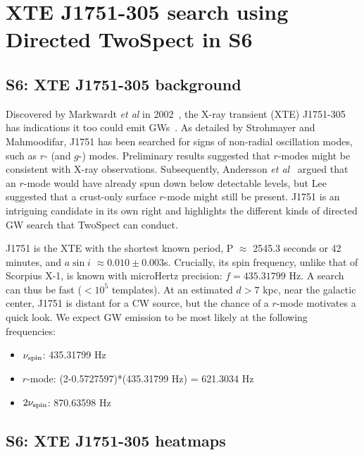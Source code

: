 \section{XTE J1751-305 search using Directed TwoSpect in S6}

\subsection{S6: XTE J1751-305 background}

Discovered by Markwardt \textit{et al} in 2002~\cite{Markwardt2002}, the X-ray transient (XTE) J1751-305 has indications it too could emit GWs~\cite{Strohmayer2014}.
As detailed by Strohmayer and Mahmoodifar, J1751 has been searched for signs of non-radial oscillation modes, such as $r$- (and $g$-) modes.
Preliminary results suggested that $r$-modes might be consistent with X-ray observations.
Subsequently, Andersson \textit{et al}~\cite{Andersson2014} argued that an $r$-mode would have already spun down below detectable levels, but Lee~\cite{Lee2014} suggested that a crust-only surface $r$-mode might still be present. 
 J1751 is an intriguing candidate in its own right and highlights the different kinds of directed GW search that TwoSpect can conduct.

J1751 is the XTE with the shortest known period,
P $\approx$$ $ 2545.3 seconds or 42 minutes, and $a \sin i$ $\approx0.010\pm0.003$s.
Crucially, its spin frequency, unlike that of Scorpius X-1, is known with microHertz precision: $f = 435.31799$ Hz.
A search can thus be fast ($< 10^5$ templates).
At an estimated $d > 7$ kpc, near the galactic center, J1751 is distant for a CW source, but the chance of a $r$-mode motivates a quick look.
We expect GW emission to be most likely at the following frequencies:

\begin{itemize}
\item $\nu_\textup{spin}$: 435.31799 Hz
\item $r$-mode: (2-0.5727597)*(435.31799 Hz) = 621.3034 Hz
\item $2\nu_\textup{spin}$: 870.63598 Hz
\end{itemize}

\subsection{S6: XTE J1751-305 heatmaps}

